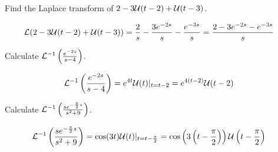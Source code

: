 \documentclass[notes]{subfiles}
\begin{document}
\begin{exercise}
    Find the Laplace transform of $2 - 3\mathcal{U}(t - 2) + \mathcal{U}(t - 3)$.
\end{exercise}
\begin{solution}
    \begin{align*}
        \mathcal{L}(2 - 3\mathcal{U}(t - 2) + \mathcal{U}(t - 3))
        &= \frac{2}{s} - \frac{3e^{-2s}}{s} - \frac{e^{-3s}}{s}
        = \frac{2 - 3e^{-2s} - e^{-3s}}{s}
    \end{align*}
\end{solution}

\begin{exercise}
    Calculate $\mathcal{L}^{-1} \left( \frac{e^{-2s}}{s - 4} \right)$.
\end{exercise}
\begin{solution}
    \begin{align*}
        \mathcal{L}^{-1} \left( \frac{e^{-2s}}{s - 4} \right)
        &= e^{4t}\mathcal{U}(t)|_{t = t - 2}
        = e^{4(t - 2)}\mathcal{U}(t - 2)
    \end{align*}
\end{solution}

\begin{exercise}
    Calculate $\mathcal{L}^{-1} \left( \frac{se^{-\frac{\pi}{2}s}}{s^2 + 9} \right)$.
\end{exercise}
\begin{solution}
    \begin{align*}
        \mathcal{L}^{-1} \left( \frac{se^{-\frac{\pi}{2}s}}{s^2 + 9} \right)
        &= \cos(3t)\mathcal{U}(t)|_{t = t - \frac{\pi}{2}}
        = \cos\left(3\left(t - \frac{\pi}{2}\right)\right)\mathcal{U}\left(t - \frac{\pi}{2}\right)
    \end{align*}
\end{solution}
\end{document}
